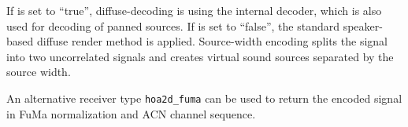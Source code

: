 If  is set to ``true'', diffuse-decoding is using the
internal decoder, which is also used for decoding of panned sources.
%
If  is set to ``false'', the standard speaker-based
diffuse render method is applied.
%
Source-width encoding splits the signal into two uncorrelated signals
and creates virtual sound sources separated by the source width.

An alternative receiver type \verb!hoa2d_fuma! can be used to return
the encoded signal in FuMa normalization and ACN channel sequence.
